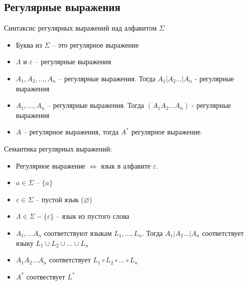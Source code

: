 \subsection{Регулярные выражения}
\begin{conj}
    Синтаксис регулярных выражений над алфавитом $\Sigma$
    \begin{itemize}
        \item Буква из $\Sigma$ -- это регулярное выражение
        \item $\Lambda$ и $\varepsilon$ -- регулярные выражения
        \item $A_1, A_2, \dots, A_n$ -- регулярные выражения. Тогда $A_1 | A_2 \dots | A_n$ - регулярные выражения
        \item $A_1, \dots, A_n$ -- регулярные выражения. Тогда $(A_1 A_2 \dots A_n)$ - регулярные выражения
        \item $A$ -- регулярное выражения, тогда $A^*$ регулярное выражение.
    \end{itemize}

    Семантика регулярных выражений: 
    \begin{itemize}
        \item Регулярное выражение $\Leftrightarrow$ язык в алфавите $\varepsilon$.
        \item $a \in \Sigma$ -- $\{a\}$
        \item $\varepsilon \in \Sigma$ -- пустой язык ($\varnothing$)
        \item $\Lambda \in \Sigma - \{\varepsilon\}$ -- язык из пустого слова 
        \item $A_1, \dots A_n$ соответствуют языкам $L_1, \dots, L_n$. Тогда $A_1 | A_2 \dots | A_n$ соответствует языку $L_1 \cup L_2 \cup \dots \cup L_n$
        \item $A_1 A_2 \dots A_n$ соответствует $L_1 \circ L_2 \circ \dots \circ L_n$
        \item $A^*$ соотвествует $L^*$
    \end{itemize}
\end{conj}

